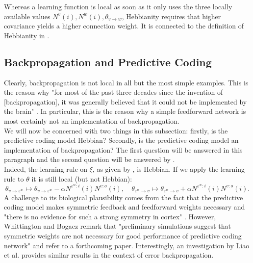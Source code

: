 \documentclass[a4paper,11pt]{report}
\begin{document}
\begin{Rem}
Whereas a learning function is local as soon as it only uses the three locally available values $N^v(i),N^w(i),\theta_{v\to w}$, Hebbianity requires that higher covariance yields a higher connection weight. It is connected to the definition of Hebbianity in \cite[][405]{Gerstner2002}.
\end{Rem}

\subsection{Backpropagation and Predictive Coding}\label{subsec:theory-learning-comp}

\begin{Par}
Clearly, backpropagation is not local in all but the most simple examples. This is the reason why "for most of the  past three decades since the invention of [backpropagation], it was generally believed that it could not be implemented by the brain" \cite[][1837]{Liao2015}. In particular, this is the reason why a simple feedforward network is most certainly not an implementation of backpropagation.\\
We will now be concerned with two things in this subsection: firstly, is the predictive coding model Hebbian? Secondly, is the predictive coding model an implementation of backpropagation? The first question will be answered in this paragraph and the second question will be answered by .\\
Indeed, the learning rule on $\xi$, as given by , is Hebbian. If we apply the learning rule to $\theta$ it is still local (but not Hebbian):
\[
\theta_{v\to \varepsilon^w}\mapsto \theta_{v\to\varepsilon^w}-\alpha N^{\varepsilon^w:i}(i)N^{v:o}(i),
\quad
\theta_{\varepsilon^w\to v}\mapsto\theta_{\varepsilon^w\to v}+\alpha N^{\varepsilon^w:i}(i)N^{v:o}(i).
\]
A challenge to its biological plausibility comes from the fact that the predictive coding model makes symmetric feedback and feedforward weights necessary and "there is no evidence for such a strong symmetry in cortex" \cite[][1254]{Whittington2017}. However, Whittington and Bogacz remark that "preliminary simulations suggest that symmetric weights are not necessary for good performance of predictive coding network" \cite[][1254]{Whittington2017} and refer to a forthcoming paper. Interestingly, an investigation by Liao et al. \cite{Liao2015} provides similar results in the context of error backpropagation.\\

\end{Par}
\end{document}
